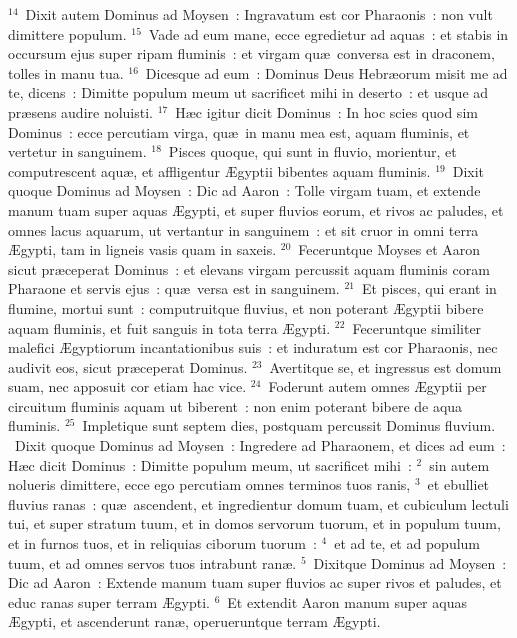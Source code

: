 ${}^{14}$~Dixit autem Dominus ad Moysen~: Ingravatum est cor Pharaonis~: non vult dimittere populum.
${}^{15}$~Vade ad eum mane, ecce egredietur ad aquas~: et stabis in occursum ejus super ripam fluminis~: et virgam qu\ae\ conversa est in draconem, tolles in manu tua.
${}^{16}$~Dicesque ad eum~: Dominus Deus Hebr\ae orum misit me ad te, dicens~: Dimitte populum meum ut sacrificet mihi in deserto~: et usque ad pr\ae sens audire noluisti.
${}^{17}$~H\ae c igitur dicit Dominus~: In hoc scies quod sim Dominus~: ecce percutiam virga, qu\ae\ in manu mea est, aquam fluminis, et vertetur in sanguinem.
${}^{18}$~Pisces quoque, qui sunt in fluvio, morientur, et computrescent aqu\ae , et affligentur \AE gyptii bibentes aquam fluminis.
${}^{19}$~Dixit quoque Dominus ad Moysen~: Dic ad Aaron~: Tolle virgam tuam, et extende manum tuam super aquas \AE gypti, et super fluvios eorum, et rivos ac paludes, et omnes lacus aquarum, ut vertantur in sanguinem~: et sit cruor in omni terra \AE gypti, tam in ligneis vasis quam in saxeis.
${}^{20}$~Feceruntque Moyses et Aaron sicut pr\ae ceperat Dominus~: et elevans virgam percussit aquam fluminis coram Pharaone et servis ejus~: qu\ae\ versa est in sanguinem.
${}^{21}$~Et pisces, qui erant in flumine, mortui sunt~: computruitque fluvius, et non poterant \AE gyptii bibere aquam fluminis, et fuit sanguis in tota terra \AE gypti.
${}^{22}$~Feceruntque similiter malefici \AE gyptiorum incantationibus suis~: et induratum est cor Pharaonis, nec audivit eos, sicut pr\ae ceperat Dominus.
${}^{23}$~Avertitque se, et ingressus est domum suam, nec apposuit cor etiam hac vice.
${}^{24}$~Foderunt autem omnes \AE gyptii per circuitum fluminis aquam ut biberent~: non enim poterant bibere de aqua fluminis.
${}^{25}$~Impletique sunt septem dies, postquam percussit Dominus fluvium.
~Dixit quoque Dominus ad Moysen~: Ingredere ad Pharaonem, et dices ad eum~: H\ae c dicit Dominus~: Dimitte populum meum, ut sacrificet mihi~:
${}^{2}$~sin autem nolueris dimittere, ecce ego percutiam omnes terminos tuos ranis,
${}^{3}$~et ebulliet fluvius ranas~: qu\ae\ ascendent, et ingredientur domum tuam, et cubiculum lectuli tui, et super stratum tuum, et in domos servorum tuorum, et in populum tuum, et in furnos tuos, et in reliquias ciborum tuorum~:
${}^{4}$~et ad te, et ad populum tuum, et ad omnes servos tuos intrabunt ran\ae .
${}^{5}$~Dixitque Dominus ad Moysen~: Dic ad Aaron~: Extende manum tuam super fluvios ac super rivos et paludes, et educ ranas super terram \AE gypti.
${}^{6}$~Et extendit Aaron manum super aquas \AE gypti, et ascenderunt ran\ae , operueruntque terram \AE gypti.
